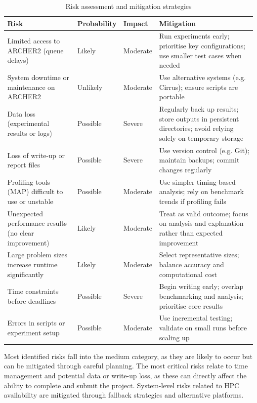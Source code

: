 \documentclass{article}
\begin{document}
\begin{table}[H]
\centering
\begin{tabular}{|p{3.5cm}|p{2cm}|p{2cm}|p{5.5cm}|}
\hline
\textbf{Risk} & \textbf{Probability} & \textbf{Impact} & \textbf{Mitigation} \\
\hline
Limited access to ARCHER2 (queue delays) & Likely & Moderate & Run experiments early; prioritise key configurations; use smaller test cases when needed \\
\hline
System downtime or maintenance on ARCHER2 & Unlikely & Moderate & Use alternative systems (e.g. Cirrus); ensure scripts are portable \\
\hline
Data loss (experimental results or logs) & Possible & Severe & Regularly back up results; store outputs in persistent directories; avoid relying solely on temporary storage \\
\hline
Loss of write-up or report files & Possible & Severe & Use version control (e.g. Git); maintain backups; commit changes regularly \\
\hline
Profiling tools (MAP) difficult to use or unstable & Possible & Moderate & Use simpler timing-based analysis; rely on benchmark trends if profiling fails \\
\hline
Unexpected performance results (no clear improvement) & Likely & Moderate & Treat as valid outcome; focus on analysis and explanation rather than expected improvement \\
\hline
Large problem sizes increase runtime significantly & Likely & Moderate & Select representative sizes; balance accuracy and computational cost \\
\hline
Time constraints before deadlines & Possible & Severe & Begin writing early; overlap benchmarking and analysis; prioritise core results \\
\hline
Errors in scripts or experiment setup & Possible & Moderate & Use incremental testing; validate on small runs before scaling up \\
\hline
\end{tabular}
\caption{Risk assessment and mitigation strategies}
\label{tab:risks}
\end{table}

Most identified risks fall into the medium category, as they are likely to occur but can be mitigated through careful planning. 
The most critical risks relate to time management and potential data or write-up loss, as these can directly affect the ability to complete and submit the project. 
System-level risks related to HPC availability are mitigated through fallback strategies and alternative platforms.
\end{document}
